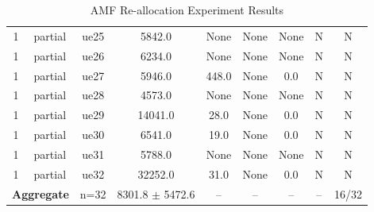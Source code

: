 \begin{table}[ht]
\begin{tabular}{|c|c|c|c|c|c|c|c|c|}
1 & partial & ue25 & 5842.0 & None & None & None & N & N \\
1 & partial & ue26 & 6234.0 & None & None & None & N & N \\
1 & partial & ue27 & 5946.0 & 448.0 & None & 0.0 & N & N \\
1 & partial & ue28 & 4573.0 & None & None & None & N & N \\
1 & partial & ue29 & 14041.0 & 28.0 & None & 0.0 & N & N \\
1 & partial & ue30 & 6541.0 & 19.0 & None & 0.0 & N & N \\
1 & partial & ue31 & 5788.0 & None & None & None & N & N \\
1 & partial & ue32 & 32252.0 & 31.0 & None & 0.0 & N & N \\
\multicolumn{2}{|c|}{\textbf{Aggregate}} & n=32 & 8301.8 $\pm$ 5472.6 & -- & -- & -- & -- & 16/32 \\
\hline
\end{tabular}
\caption{AMF Re-allocation Experiment Results}
\label{tab:amf_realloc}
\end{table}
